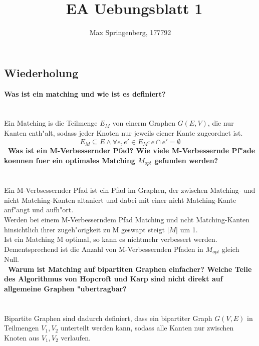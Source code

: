 \documentclass{article}
\author{Max Springenberg, 177792}
\title{\
    EA Uebungsblatt 1
    }
\date{}
\newcommand{\gap}{\null\ \\ \\}
\newcommand{\task}[1]{\textbf{#1} \\ \gap}
\begin{document}
\maketitle
\newpage
\subsection{Wiederholung}
\task{Was ist ein matching und wie ist es definiert?}
Ein Matching is die Teilmenge $E_M$ von einerm Graphen $G(E,V)$, die nur Kanten
    enth"alt, sodass jeder Knoten nur jeweils eiener Kante zugeordnet ist.\[
        E_M \subseteq E \land \forall e, e' \in E_M : e \cap e' = \emptyset
    \]
\task{\
    Was ist ein M-Verbessernder Pfad? Wie viele M-Verbessernde Pf"ade koennen
        fuer ein optimales Matching $M_{opt}$ gefunden werden?
    }
Ein M-Verbsessernder Pfad ist ein Pfad im Graphen, der zwischen Matching- und 
    nicht Matching-Kanten altaniert und dabei mit einer nicht Matching-Kante 
    anf"angt und aufh"ort.\\
Werden bei einem M-Verbesserndem Pfad Matching und ncht Matching-Kanten
    hinsichtlich ihrer zugeh"origkeit zu M geswapt steigt $|M|$ um 1.\\
Ist ein Matching M optimal, so kann es nichtmehr verbessert werden.
    Dementsprechend ist die Anzahl von M-Verbessernden Pfaden in $M_{opt}$
    gleich Null.\\
\task{\
    Warum ist Matching auf bipartiten Graphen einfacher? Welche Teile des
        Algorithmus von Hopcroft und Karp sind nicht direkt auf allgemeine
        Graphen "ubertragbar?
    }
Bipartite Graphen sind dadurch definiert, dass ein bipartiter Graph $G(V,E)$
    in Teilmengen $V_1, V_2$ unterteilt werden kann, sodass alle Kanten nur
    zwischen Knoten aus $V_1, V_2$ verlaufen.\\
\end{document}
